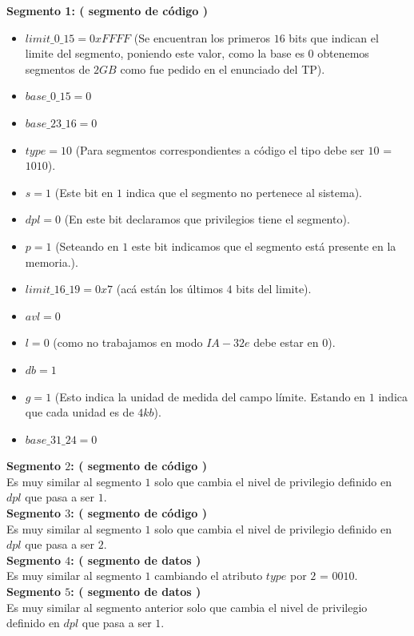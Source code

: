 \documentclass[a4paper,10pt,twoside]{article}
\begin{document}
\textbf{Segmento 1: ( segmento de código )}
\begin{itemize}
 \item $limit\_0\_15 = 0xFFFF$ (Se encuentran los primeros $16$ bits que indican el limite del segmento, poniendo este valor, como la base es $0$ obtenemos segmentos de $2GB$ como fue pedido en el enunciado del TP).
 \item $base\_0\_15 = 0$ 
 \item $base\_23\_16 = 0$
 \item $type = 10$ (Para segmentos correspondientes a código el tipo debe ser $10$ = $1010$).
 \item $s = 1$ 	(Este bit en $1$ indica que el segmento no pertenece al sistema).
 \item $dpl = 0$ (En este bit declaramos que privilegios tiene el segmento).
 \item $p = 1$ (Seteando en $1$ este bit indicamos que el segmento está presente en la memoria.).
 \item $limit\_16\_19 = 0x7$ (acá están los últimos $4$ bits del limite).
 \item $avl = 0$
 \item $l = 0$ (como no trabajamos en modo $IA-32e$ debe estar en $0$).
 \item $db = 1$
 \item $g = 1$ (Esto indica la unidad de medida del campo límite. Estando en $1$ indica que cada unidad es de $4kb$).
 \item $base\_31\_24  = 0$
\end{itemize}

\textbf{Segmento $2$: ( segmento de código )} \\
Es muy similar al segmento $1$ solo que cambia el nivel de privilegio definido en $dpl$ que pasa a ser $1$. \\

\textbf{Segmento $3$: ( segmento de código )} \\
Es muy similar al segmento $1$ solo que cambia el nivel de privilegio definido en $dpl$ que pasa a ser $2$. \\

\textbf{Segmento $4$: ( segmento de datos )} \\
Es muy similar al segmento $1$ cambiando el atributo $type$ por $2$ = $0010$. \\

\textbf{Segmento $5$: ( segmento de datos )} \\
Es muy similar al segmento anterior solo que cambia el nivel de privilegio definido en $dpl$ que pasa a ser $1$. \\
\end{document}
